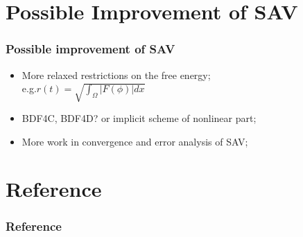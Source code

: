 \documentclass{beamer}
\begin{document}
\section{Possible Improvement of SAV}
    \begin{frame}
    \frametitle{Possible improvement of SAV}

    \begin{itemize}
      \item More relaxed restrictions on the free energy;\\
      e.g.$r(t)=\sqrt{\int_\Omega |F(\phi)|dx}$
      \item BDF4C, BDF4D? or implicit scheme of nonlinear part;
      \item More work in convergence and error analysis of SAV;
    \end{itemize}

    \end{frame}
    
\section{Reference}
    \begin{frame}[allowframebreaks]
\frametitle{Reference}
    \printbibliography

    \end{frame}
\end{document}
